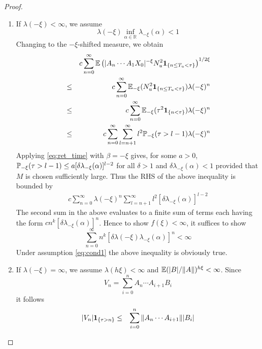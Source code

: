 \documentclass{article}
\theoremstyle{remark}
\begin{document}
\begin{proof}
  \begin{enumerate}
  \item If $\lambda(-\xi) < \infty$, we assume
    \begin{equation}
      \label{eq:cond1}
      \lambda(-\xi)
      \inf_{\alpha \in \mathbb R} \lambda_{-\xi}(\alpha) < 1
    \end{equation}
    Changing to the $-\xi$-shifted measure, we obtain
    \begin{eqnarray}
      &&
      c \sum_{n=0}^\infty
      \E \left(
        |A_n \cdots A_1 X_0|^{-\xi}
        N_u^2
        \1{n \leq T_u < \tau}        
      \right)^{1/2\xi} \\
      &\leq&
      c \sum_{n=0}^\infty
      \E_{-\xi} (N_u^2 \1{n \leq T_u < \tau})
      \lambda(-\xi)^n \\
      &\leq&
      c \sum_{n=0}^\infty
      \E_{-\xi} (\tau^2 \1{n < \tau})
      \lambda(-\xi)^n \\
      &\leq&
      c \sum_{n=0}^\infty
      \sum_{l=n+1}^\infty
      l^2 \P_{-\xi}(\tau > l-1)
      \lambda(-\xi)^n
    \end{eqnarray}
    Applying \eqref{eq:ret_time} with $\beta = -\xi$ gives, for some
    $a > 0$, $\P_{-\xi}(\tau > l-1) \leq a [\delta \lambda_{-\xi}(\alpha)]^{l-2}$
    for all $\delta > 1$ and $\delta \lambda_{-\xi}(\alpha) < 1$
    provided that $M$ is chosen sufficiently large. Thus the RHS of the
    above inequality is bounded by
    \begin{eqnarray*}
      c \sum_{n=0}^\infty
      \lambda(-\xi)^n
      \sum_{l=n+1}^\infty
      l^2 [\delta \lambda_{-\xi}(\alpha)]^{l-2}
    \end{eqnarray*}
    The second sum in the above evaluates to a finite sum of terms
    each having the form $c n^k [\delta
    \lambda_{-\xi}(\alpha)]^n$. Hence to show $f(\xi) < \infty$, it
    suffices to show
    \begin{equation*}
      \sum_{n=0}^\infty
      n^k [\delta \lambda(-\xi) \lambda_{-\xi}(\alpha)]^n < \infty
    \end{equation*}
    Under assumption \eqref{eq:cond1} the above inequality is
    obviously true.
  \item If $\lambda(-\xi) = \infty$, we assume $\lambda(h\xi) <
    \infty$ and $\E(|B|/\|A\|)^{h\xi} <  \infty$. Since
    \[
    V_n = \sum_{i=0}^n A_n \cdots A_{i+1} B_i
    \]
    it follows
    \begin{eqnarray*}
      |V_n|\1{\tau > n} &\leq&
      \sum_{i=0}^{n} \|A_n \cdots A_{i+1}\| |B_i| \\

\end{eqnarray*}
\end{enumerate}
\end{proof}
\end{document}
